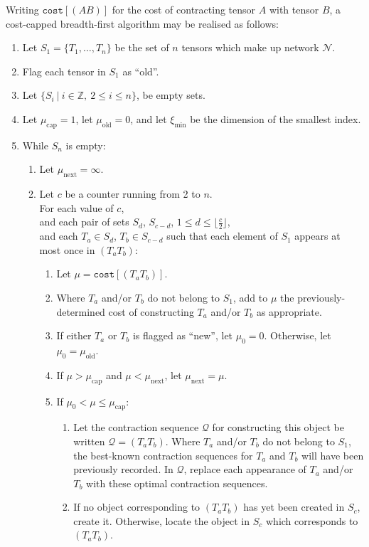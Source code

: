 \documentclass[aps,pre,reprint,superscriptaddress,amsfonts,amsmath,showpacs,nofootinbib,floatfix]{revtex4-1}
\newcommand{\mrm}[1]{\mathrm{#1}}
\newcommand{\mbb}[1]{\mathbb{#1}}
\newcommand{\mc}[1]{\mathcal{#1}}
\newcommand{\ttt}[1]{\texttt{#1}}
\newcommand{\fuse}[2]{(#1#2)} %
\begin{document}
Writing $\ttt{cost}[\fuse{A}{B}]$ for the cost of contracting tensor $A$ with tensor $B$, a cost-capped breadth-first algorithm may be realised as follows:

\begin{enumerate}
\item Let $S_1=\{T_1,\ldots,T_n\}$ be the set of $n$ tensors which make up network $\mc{N}$.
\item Flag each tensor in $S_1$ as ``old''.
\item Let $\{S_i~|~i\in\mbb{Z},~2\leq i\leq n\}$, be empty sets.
\item Let $\mu_\mrm{cap}=1$, let $\mu_\mrm{old}=0$, and let $\xi_\mrm{min}$ be the dimension of the smallest index.
\item While $S_n$ is empty:
\begin{enumerate}
\item Let $\mu_\mrm{next}=\infty$.
\item Let $c$ be a counter running from 2 to $n$.\\For each value of $c$,\\and each pair of sets $S_d$, $S_{c-d}$, $1\leq d\leq \lfloor \frac{c}{2}\rfloor$,\\and each $T_a\in S_d$, $T_b\in S_{c-d}$ such that each element of $S_1$ appears at most once in $\fuse{T_a}{T_b}$:
\begin{enumerate}
\item Let $\mu=\ttt{cost}[\fuse{T_a}{T_b}]$.
\item Where $T_a$ and/or $T_b$ do not belong to $S_1$, add to $\mu$ the previously-determined cost of constructing $T_a$ and/or $T_b$ as appropriate.
\item If either $T_a$ or $T_b$ is flagged as ``new'', let $\mu_0=0$. Otherwise, let $\mu_0=\mu_\mrm{old}$.
\item If $\mu>\mu_\mrm{cap}$ and $\mu<\mu_\mrm{next}$, let $\mu_\mrm{next}=\mu$.
\item If $\mu_0<\mu\leq\mu_\mrm{cap}$: 
\begin{enumerate}
\item Let the contraction sequence $\mc{Q}$ for constructing this object be written $\mc{Q}=\fuse{T_a}{T_b}$. Where $T_a$ and/or $T_b$ do not belong to $S_1$, the best-known contraction sequences for $T_a$ and $T_b$ will have been previously recorded. In $\mc{Q}$, replace each appearance of $T_a$ and/or $T_b$ with these optimal contraction sequences.
\item If no object corresponding to $\fuse{T_a}{T_b}$ has yet been created in $S_c$, create it. Otherwise, locate the object in $S_c$ which corresponds to $\fuse{T_a}{T_b}$.

\end{enumerate}
\end{enumerate}
\end{enumerate}
\end{enumerate}
\end{document}

